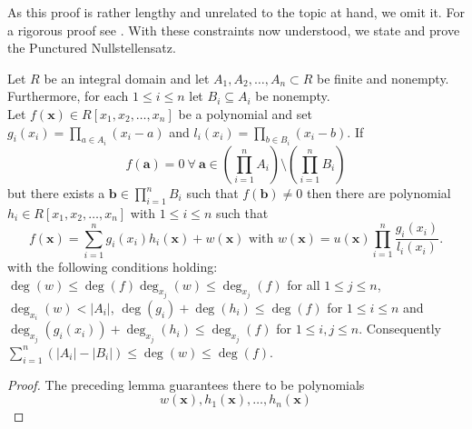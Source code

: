 As this proof is rather lengthy and unrelated to the topic at hand, we omit it. For a rigorous proof see \cite{grynkiewicz_2013}. With these constraints now understood, we state and prove the Punctured Nullstellensatz.
	\begin{theorem} Let $R$ be an integral
	domain and let $A_1, A_2, \ldots, A_{n} \subset R$ be finite and
	nonempty. Furthermore, for each $1\le i \le n$ let $ B_{i} \subseteq
	A_{i}$ be nonempty.\\ Let $f\left( \textbf{x} \right) \in R[x_1, x_2,
	\ldots, x_{n}]$ be a polynomial and set $g_{i}\left( x_{i} \right) =
	\prod_{a \in A_{i}}^{}\left( x_{i}-a \right)$ and $l_{i}\left( x_{i}
	\right) = \prod_{b \in B_{i}}^{} \left( x_{i}-b \right) $. If
	\begin{equation} f\left( \textbf{a} \right) = 0 \ \forall \
		\textbf{a}\in\left( \prod_{i=1}^{n} A_{i} \right)
		\setminus\left( \prod_{i=1}^{n} B_{i} \right) \end{equation}
		but there exists a $\textbf{b} \in \prod_{i=1}^{n} B_{i}$ such
		that $f\left( \textbf{b} \right) \neq 0 $ then there are
		polynomial $h_{i} \in R[x_1, x_2, \ldots, x_{n}]$ with $1 \le i
		\le n$ such that \[ f\left( \textbf{x} \right) = \sum_{i=
			1}^{n} g_{i} \left( x_{i} \right) h_{i} \left(
		\textbf{x} \right)  + w\left( \textbf{x} \right) \text{ with }
		w\left( \textbf{x} \right) = u\left( \textbf{x} \right)
		\prod_{i=1}^{n} \frac{g_{i}\left( {x}_{i} \right) }{l_{i}
		\left( x_{i} \right) } .\]  with the following conditions
		holding: \newline $\deg \left( w \right) \le \deg \left( f
		\right) \deg _{ x_j} \left( w \right) \le \deg _{ x_j} \left(
	f \right) $ for all $1 \le j \le n$, $\deg _{x_{i}} \left( w \right)  <
	\left| A_{i} \right| $, $\deg \left( g_{i} \right) + \deg \left( h_{i}
	\right)\le \deg \left( f \right)$ for $1 \le i \le n$ and\\	 $\deg
	_{ x_j} \left( g_{i} \left( x_{i} \right)  \right) + \deg _{ x_j}
	\left( h_{i} \right) \le \deg _{ x_j} \left(  f \right) $ for $1 \le
	i,j \le n$. Consequently $\sum_{i= 1}^{n} \left( \left|  A_{i} \right|
	- \left| B_{i} \right|  \right)  \le \deg \left(  w \right) \le \deg
	\left(  f \right)$.  \end{theorem} \begin{proof}[Proof] The preceding
	lemma guarantees there to be polynomials \[w\left( \textbf{x} \right) ,
	h_1 \left( \textbf{x} \right) , \ldots, h_{n} \left( \textbf{x} \right)
\]
\end{proof}
